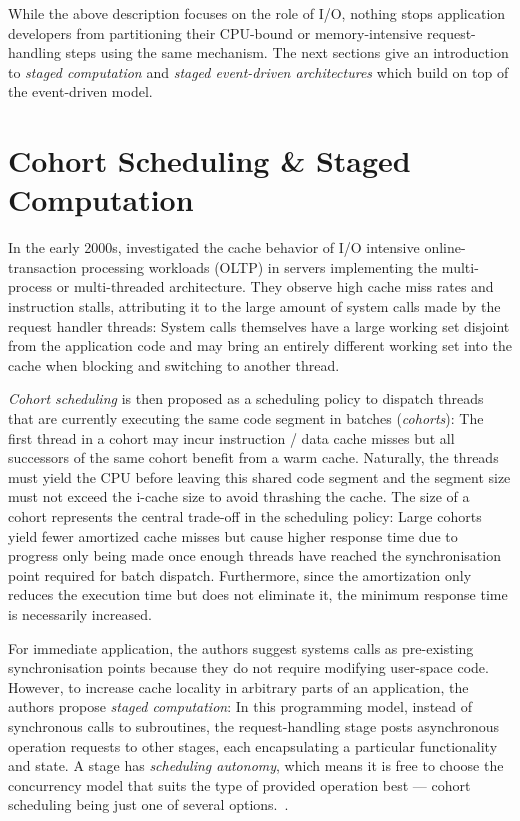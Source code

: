 \documentclass[12pt,a4paper]{book}
\begin{document}
While the above description focuses on the role of I/O, nothing stops application developers from partitioning their CPU-bound or memory-intensive request-handling steps using the same mechanism.
The next sections give an introduction to \emph{staged computation} and \emph{staged event-driven architectures} which build on top of the event-driven model.

\section{Cohort Scheduling \& Staged Computation}\label{ch:relwork:cohort}
In the early 2000s, \citeauthor*{cohort} investigated the cache behavior of I/O intensive online-transaction processing workloads (OLTP) in servers implementing the multi-process or multi-threaded architecture.
They observe high cache miss rates and instruction stalls, attributing it to the large amount of system calls made by the request handler threads:
System calls themselves have a large working set disjoint from the application code and may bring an entirely different working set into the cache when blocking and switching to another thread.~\cite{cohort}

\emph{Cohort scheduling} is then proposed as a scheduling policy to dispatch threads that are currently executing the same code segment in batches (\emph{cohorts}):
The first thread in a cohort may incur instruction / data cache misses but all successors of the same cohort benefit from a warm cache.
Naturally, the threads must yield the CPU before leaving this shared code segment and the segment size must not exceed the i-cache size to avoid thrashing the cache.
The size of a cohort represents the central trade-off in the scheduling policy: Large cohorts yield fewer amortized cache misses but cause higher response time due to progress only being made once enough threads have reached the synchronisation point required for batch dispatch.
Furthermore, since the amortization only reduces the execution time but does not eliminate it, the minimum response time is necessarily increased.~\cite{cohort}

For immediate application, the authors suggest systems calls as pre-existing synchronisation points because they do not require modifying user-space code.
However, to increase cache locality in arbitrary parts of an application, the authors propose \emph{staged computation}:
In this programming model, instead of synchronous calls to subroutines, the request-handling stage posts asynchronous operation requests to other stages, each encapsulating a particular functionality and state.
A stage has \emph{scheduling autonomy}, which means it is free to choose the concurrency model that suits the type of provided operation best --- cohort scheduling being just one of several options.~\cite{cohort}.
\end{document}
